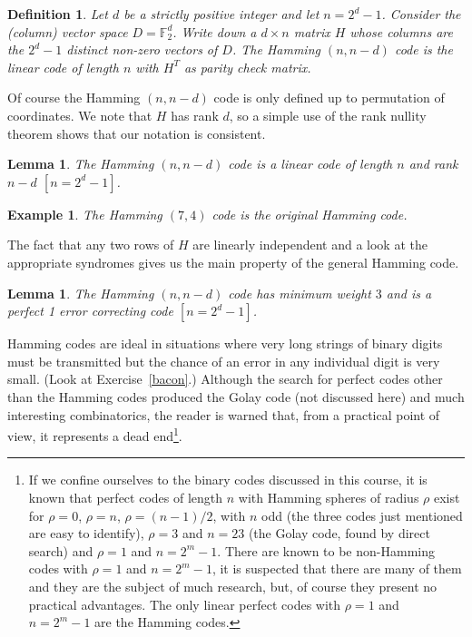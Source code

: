 \documentclass[12pt,a4paper]{article}
\theoremstyle{plain}
\newtheorem{lemma}[theorem]{Lemma}
\newtheorem{definition}[theorem]{Definition}
\newtheorem{example}[theorem]{Example}
\theoremstyle{definition}
\begin{document}
\begin{definition} Let $d$ be a strictly
positive integer and let $n=2^{d}-1$.
Consider the  (column) vector
space $D={\mathbb F}_{2}^{d}$. Write down
a $d\times n$ matrix $H$ whose columns
are the $2^{d}-1$ distinct non-zero vectors
of $D$. The Hamming $(n,n-d)$ code is
the linear code of length $n$ with $H^{T}$
as parity check matrix.
\end{definition}

Of course the Hamming $(n,n-d)$ code is only
defined up to permutation of coordinates.
We note that $H$ has rank $d$, so a simple
use of the rank nullity theorem shows
that our notation is consistent.
\begin{lemma}  The Hamming $(n,n-d)$ code is
a linear code of length $n$ and rank $n-d$ $[n=2^{d}-1]$.
\end{lemma}
\begin{example} The Hamming $(7,4)$ code
is the original Hamming code.
\end{example}

The fact that any two rows of $H$ are linearly
independent and a look at the appropriate syndromes
gives us the main property of the general Hamming code.
\begin{lemma} The Hamming $(n,n-d)$ code
has minimum weight $3$ and is a perfect
1 error correcting code $[n=2^{d}-1]$.
\end{lemma}
Hamming codes are ideal in situations where
very long strings of binary digits must be transmitted
but the chance of an error in any individual
digit is very small. (Look at Exercise~\ref{bacon}.)
Although the search for perfect codes other than the Hamming codes
produced
the Golay code (not discussed here) and much interesting
combinatorics, the reader is warned that, from a practical
point of view, it represents a dead
end\footnote{If we confine ourselves to the  binary
codes discussed in this course, it is known
that perfect codes of length $n$ with Hamming spheres of radius
$\rho$ exist for $\rho=0$, $\rho=n$, $\rho=(n-1)/2$,
with $n$ odd (the three codes just mentioned are
easy to identify), $\rho=3$ and $n=23$ (the Golay code,
found by direct search) and $\rho=1$ and $n=2^{m}-1$.
There are known to be non-Hamming codes with  $\rho=1$ and $n=2^{m}-1$,
it is suspected that there are many of them and
they are the subject of much research, but,
of course they present no practical advantages.
The only linear perfect codes with $\rho=1$ and $n=2^{m}-1$
are the Hamming codes.}.
\end{document}
